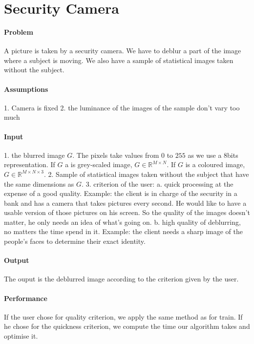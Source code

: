 \section{Security Camera}

\paragraph{Problem}
A picture is taken by a security camera. We have to deblur a part of the image where a subject is moving. We also have a sample of statistical images taken without the subject.

\paragraph{Assumptions}
1. Camera is fixed 2. the luminance of the images of the sample don't vary too much

\paragraph{Input}
1. the blurred image $G$. The pixels take values from $0$ to $255$ as we use a 8bits representation. If $G$ a is grey-scaled image, $G \in \mathbb{R}^{M \times N}$. If $G$ is a coloured image, $G \in \mathbb{R}^{M \times N \times 3}$. 2. Sample of statistical images taken without the subject that have the same dimensions as $G$. 3. criterion of the user: a. quick processing at the expense of a good quality. Example: the client is in charge of the security in a bank and has a camera that takes pictures every second. He would like to have a usable version of those pictures on his screen. So the quality of the images doesn't matter, he only needs an idea of what's going on. b. high quality of deblurring, no matters the time spend in it. Example: the client needs a sharp image of the people's faces to determine their exact identity.

\paragraph{Output}
The ouput is the deblurred image according to the criterion given by the user.

\paragraph{Performance}
If the user chose for quality criterion, we apply the same method as for train. If he chose for the quickness criterion, we compute the time our algorithm takes and optimise it. 


